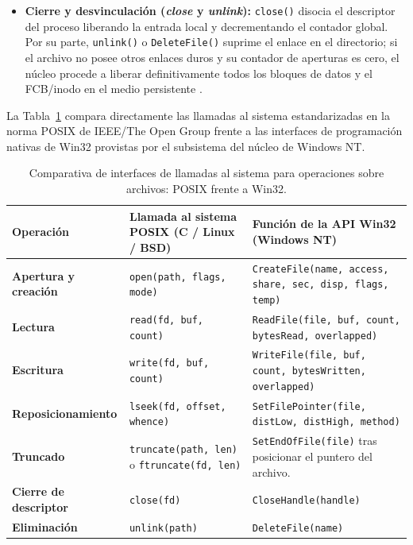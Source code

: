 \documentclass[12pt]{article}
\begin{document}
\begin{itemize}[noitemsep, topsep=2pt]
    \item \textbf{Cierre y desvinculación (\textit{close} y \textit{unlink}):} \texttt{close()} disocia el descriptor del proceso liberando la entrada local y decrementando el contador global. Por su parte, \texttt{unlink()} o \texttt{DeleteFile()} suprime el enlace en el directorio; si el archivo no posee otros enlaces duros y su contador de aperturas es cero, el núcleo procede a liberar definitivamente todos los bloques de datos y el FCB/inodo en el medio persistente \parencite[\S 8.4.2, p.\ 442]{carretero2001sistemas}.
\end{itemize}

La Tabla~\ref{tab:llamadasSistemaArchivos} compara directamente las llamadas al sistema estandarizadas en la norma POSIX de IEEE/The Open Group frente a las interfaces de programación nativas de Win32 provistas por el subsistema del núcleo de Windows NT.

\begin{table}[H]
\centering
\footnotesize
\renewcommand{\arraystretch}{1.1}
\renewcommand{\tabularxcolumn}[1]{m{#1}}
\setlength{\emergencystretch}{1.5em}
\caption{Comparativa de interfaces de llamadas al sistema para operaciones sobre archivos: POSIX frente a Win32.}
\label{tab:llamadasSistemaArchivos}
\begin{tabularx}{\textwidth}{>{\centering\arraybackslash}m{3.6cm} X X}
\toprule
\textbf{Operación} & \textbf{Llamada al sistema POSIX (C / Linux / BSD)} & \textbf{Función de la API Win32 (Windows NT)} \\
\midrule
\textbf{Apertura y creación} & \texttt{open(path, flags, mode)} & \texttt{CreateFile(name, access, share, sec, disp, flags, temp)} \\
\addlinespace
\textbf{Lectura} & \texttt{read(fd, buf, count)} & \texttt{ReadFile(file, buf, count, bytesRead, overlapped)} \\
\addlinespace
\textbf{Escritura} & \texttt{write(fd, buf, count)} & \texttt{WriteFile(file, buf, count, bytesWritten, overlapped)} \\
\addlinespace
\textbf{Reposicionamiento} & \texttt{lseek(fd, offset, whence)} & \texttt{SetFilePointer(file, distLow, distHigh, method)} \\
\addlinespace
\textbf{Truncado} & \texttt{truncate(path, len)} o \texttt{ftruncate(fd, len)} & \texttt{SetEndOfFile(file)} tras posicionar el puntero del archivo. \\
\addlinespace
\textbf{Cierre de descriptor} & \texttt{close(fd)} & \texttt{CloseHandle(handle)} \\
\addlinespace
\textbf{Eliminación} & \texttt{unlink(path)} & \texttt{DeleteFile(name)} \\
\bottomrule
\end{tabularx}
\end{table}
\end{document}

